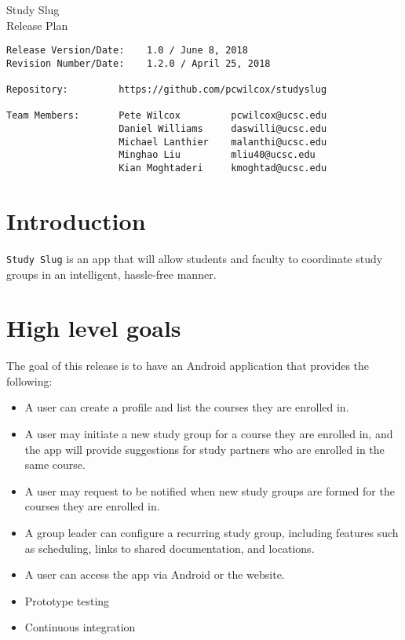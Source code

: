 \documentclass[10pt]{article}
\begin{document}
    
    \begin{center}
        \Huge{Study Slug} \\
        \Large{Release Plan}
    \end{center}
    \begin{verbatim}
Release Version/Date:    1.0 / June 8, 2018        
Revision Number/Date:    1.2.0 / April 25, 2018

Repository:         https://github.com/pcwilcox/studyslug

Team Members:       Pete Wilcox         pcwilcox@ucsc.edu    
                    Daniel Williams     daswilli@ucsc.edu  
                    Michael Lanthier    malanthi@ucsc.edu  
                    Minghao Liu         mliu40@ucsc.edu
                    Kian Moghtaderi     kmoghtad@ucsc.edu
    \end{verbatim}
    
    \section{Introduction}
    \texttt{Study Slug} is an app that will allow students and faculty to coordinate study groups in an intelligent, hassle-free manner.
    
    \section{High level goals}
    The goal of this release is to have an Android application that provides the following:
    \begin{itemize}
        \item A user can create a profile and list the courses they are enrolled in.
        \item A user may initiate a new study group for a course they are enrolled in, and the app will provide suggestions for study partners who are enrolled in the same course.
        \item A user may request to be notified when new study groups are formed for the courses they are enrolled in.
        \item A group leader can configure a recurring study group, including features such as scheduling, links to shared documentation, and locations.
        \item A user can access the app via Android or the website.
        \item Prototype testing
        \item Continuous integration
    \end{itemize}
    
\end{document}
